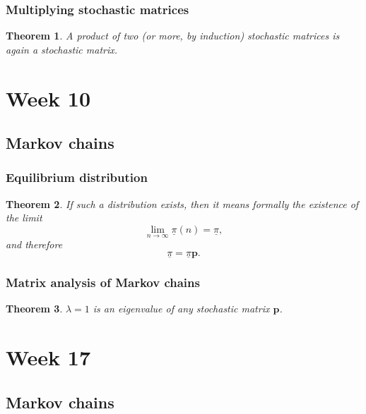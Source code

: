 \documentclass{article}
\newtheorem{theorem}{Theorem}
\begin{document}
\subsubsection{Multiplying stochastic matrices}
\begin{theorem}
    A product of two (or more, by induction) stochastic matrices is again a stochastic matrix.
\end{theorem}

\section{Week 10}
\subsection{Markov chains}
\subsubsection{Equilibrium distribution}
\begin{theorem}
    If such a distribution exists, then it means formally the existence of the limit
    \begin{equation}
        \lim_{n\to\infty}\underline{\pi}(n)=\underline{\pi},
    \end{equation}
    and therefore
    \begin{equation}
        \underline{\pi} = \underline{\pi}\mathbf{p}.
    \end{equation}
\end{theorem}
\subsubsection{Matrix analysis of Markov chains}
\begin{theorem}
    $\lambda=1$ is an eigenvalue of any stochastic matrix $\mathbf{p}$.
\end{theorem}



\section{Week 17}


\subsection{Markov chains}
\end{document}
